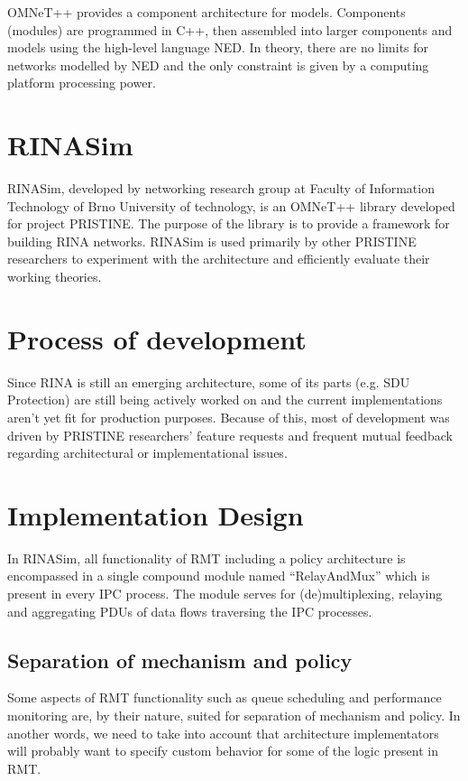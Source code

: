         OMNeT++ provides a component architecture for models. Components (modules) are programmed in C++, then assembled into larger components and models using the high-level language NED. In theory, there are no limits for networks modelled by NED and the only constraint is given by a computing platform processing power.

    \section{RINASim}
        RINASim, developed by networking research group at Faculty of Information Technology of Brno University of technology, is an OMNeT++ library developed for project PRISTINE. The purpose of the library is to provide a framework for building RINA networks. RINASim is used primarily by other PRISTINE researchers to experiment with the architecture and efficiently evaluate their working theories.

    \section{Process of development}
        Since RINA is still an emerging architecture, some of its parts (e.g. SDU Protection) are still being actively worked on and the current implementations aren't yet fit for production purposes. Because of this, most of development was driven by PRISTINE researchers' feature requests and frequent mutual feedback regarding architectural or implementational issues.

    \section{Implementation Design}

        In RINASim, all functionality of RMT including a policy architecture is encompassed in a single compound module named ``RelayAndMux'' which is present in every IPC process. The module serves for (de)multiplexing, relaying and aggregating PDUs of data flows traversing the IPC processes.

        \subsection{Separation of mechanism and policy}
            Some aspects of RMT functionality such as queue scheduling and performance monitoring are, by their nature, suited for separation of mechanism and policy. In another words, we need to take into account that architecture implementators will probably want to specify custom behavior for some of the logic present in RMT.


